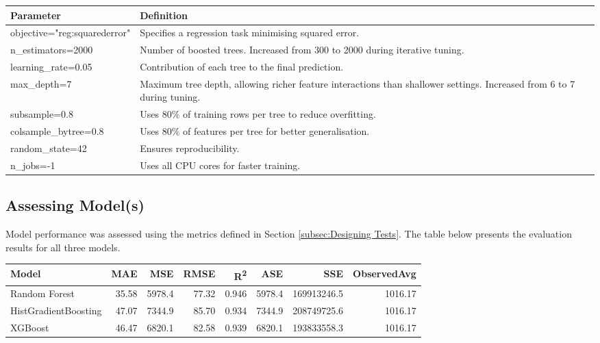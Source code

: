 \begin{table}[H]
    \centering
    \begin{tabular}{||l|p{12cm}||}
    \hline
    \hline
        Parameter & Definition \\
        \hline
        \hline
        objective="reg:squarederror" & Specifies a regression task minimising squared error. \\
        \hline
        n\_estimators=2000 & Number of boosted trees. Increased from 300 to 2000 during iterative tuning. \\
        \hline
        learning\_rate=0.05 & Contribution of each tree to the final prediction. \\
        \hline
        max\_depth=7 & Maximum tree depth, allowing richer feature interactions than shallower settings. Increased from 6 to 7 during tuning. \\
        \hline
        subsample=0.8 & Uses 80\% of training rows per tree to reduce overfitting. \\
        \hline
        colsample\_bytree=0.8 & Uses 80\% of features per tree for better generalisation. \\
        \hline
        random\_state=42 & Ensures reproducibility. \\
        \hline
        n\_jobs=-1 & Uses all CPU cores for faster training. \\
        \hline
        \hline
    \end{tabular}
\end{table}



\subsection{Assessing Model(s)}
\label{subsec:Assessing Model(s)}
\noindent
Model performance was assessed using the metrics defined in Section \ref{subsec:Designing Tests}. The table below presents the evaluation results for all three models.

\begin{table}[ht]
\centering
\small
\begin{adjustbox}{max width=\textwidth}
\begin{tabular}{|l|r|r|r|r|r|r|r|}
\hline
\hline
Model & MAE & MSE & RMSE & R\textsuperscript{2} & ASE & SSE & ObservedAvg\\
\hline
Random Forest & 35.58 & 5978.4 & 77.32 & 0.946 & 5978.4 & 169913246.5 & 1016.17\\
HistGradientBoosting & 47.07 & 7344.9 & 85.70 & 0.934 & 7344.9 & 208749725.6 & 1016.17\\
XGBoost & 46.47 & 6820.1 & 82.58 & 0.939 & 6820.1 & 193833558.3 & 1016.17\\
\hline
\hline
\end{tabular}
\end{adjustbox}
\end{table}

